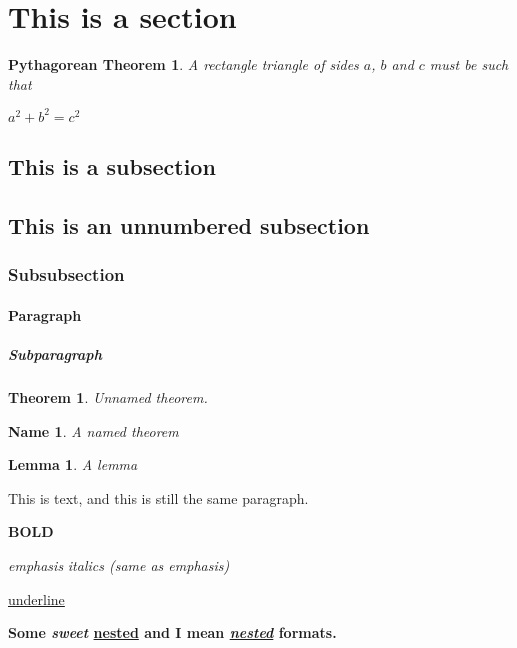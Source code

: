 \documentclass{article}
\title{}
\author{Miguel Murça}
\date{November 10, 2016}
\newtheorem*{theorem0}{Pythagorean Theorem}
\newtheorem{theorem1}{Theorem}
\newtheorem*{theorem2}{Name}
\newtheorem{theorem3}{Lemma}
\begin{document}
\maketitle
\section{This is a section}

\begin{theorem0}
    A rectangle triangle of sides $a$, $b$ and $c$ must be
    such that
\begin{center}
$a^2 + b^2 = c^2$
\end{center}
\end{theorem0}

\subsection{This is a subsection}

\subsection*{This is an unnumbered subsection}

\subsubsection{Subsubsection}

\paragraph{Paragraph}

\subparagraph{Subparagraph}

\begin{theorem1}
    Unnamed theorem.
\end{theorem1}

\begin{theorem2}
    A named theorem
\end{theorem2}

\begin{theorem3}
    A lemma
\end{theorem3}

This is text,
and this is still the same paragraph.

\textbf{BOLD}

\emph{emphasis}
\emph{italics (same as emphasis)}

\underline{underline}

\textbf{Some \emph{sweet} \underline{nested} and I mean \underline{\emph{nested}} formats.}
\end{document}
